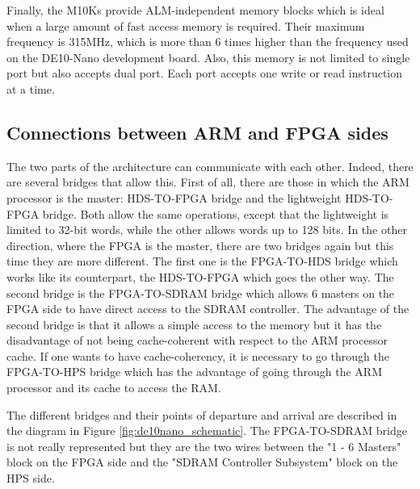 \documentclass[12pt]{article}
\begin{document}
\vspace{12pt}
Finally, the M10Ks provide ALM-independent memory blocks which is ideal when a large amount of fast access memory is required. Their maximum frequency is 315MHz, which is more than 6 times higher than the frequency used on the DE10-Nano development board. Also, this memory is not limited to single port but also accepts dual port. Each port accepts one write or read instruction at a time.

\subsection{Connections between ARM and FPGA sides}

The two parts of the architecture can communicate with each other. Indeed, there are several bridges that allow this. First of all, there are those in which the ARM processor is the master: HDS-TO-FPGA bridge and the lightweight HDS-TO-FPGA bridge. Both allow the same operations, except that the lightweight is limited to 32-bit words, while the other allows words up to 128 bits. In the other direction, where the FPGA is the master, there are two bridges again but this time they are more different. The first one is the FPGA-TO-HDS bridge which works like its counterpart, the HDS-TO-FPGA which goes the other way. The second bridge is the FPGA-TO-SDRAM bridge which allows 6 masters on the FPGA side to have direct access to the SDRAM controller. The advantage of the second bridge is that it allows a simple access to the memory but it has the disadvantage of not being cache-coherent with respect to the ARM processor cache. If one wants to have cache-coherency, it is necessary to go through the FPGA-TO-HPS bridge which has the advantage of going through the ARM processor and its cache to access the RAM.

\vspace{12pt}
The different bridges and their points of departure and arrival are described in the diagram in Figure \ref{fig:de10nano_schematic}. The FPGA-TO-SDRAM bridge is not really represented but they are the two wires between the "1 - 6 Masters" block on the FPGA side and the "SDRAM Controller Subsystem" block on the HPS side.
\end{document}
